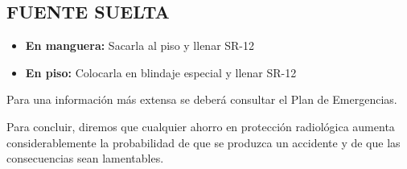 \subsection*{FUENTE SUELTA}
\begin{itemize}
    \item \textbf{En manguera:} Sacarla al piso y llenar SR-12
    \item \textbf{En piso:} Colocarla en blindaje especial y llenar SR-12
\end{itemize}

Para una información más extensa se deberá consultar el Plan de Emergencias.

Para concluir, diremos que cualquier ahorro en protección radiológica aumenta considerablemente la probabilidad de que se produzca un accidente y de que las consecuencias sean lamentables.
